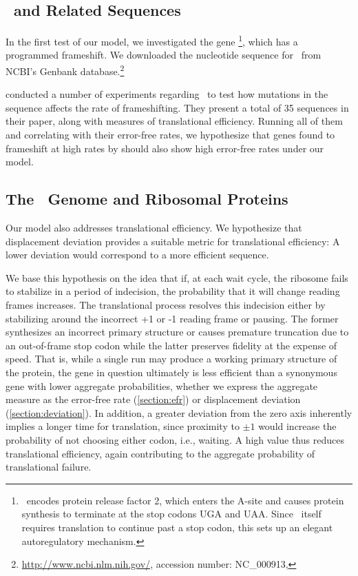 \documentclass[12pt]{article}
\begin{document}
\subsection{\prfB\ and Related Sequences}
In the first test of our model, we investigated the gene
\prfB\footnote{\prfB\ encodes protein release factor 2, which enters
  the A-site and causes protein synthesis to terminate at the stop
  codons \textsc{UGA} and \textsc{UAA}. Since \prfB\ itself requires 
  translation to continue past a stop codon, this sets up an elegant 
  autoregulatory mechanism.}, which has a programmed frameshift.
We downloaded the nucleotide sequence for \prfB\ from
NCBI's Genbank database.\footnote{\url{http://www.ncbi.nlm.nih.gov/},
  accession number: NC\_000913, \prfB}

\citet{weiss87} conducted a number of experiments regarding
\prfB\ to test how mutations in the sequence affects the rate of
frameshifting.  They present a total of 35 sequences in their paper,
along with measures of translational efficiency.  Running all of
them and correlating with their error-free rates, we hypothesize that
genes found to frameshift at high rates by
\citeauthor{weiss87} should also show high error-free rates under
our model.

\subsection{The \ecoli\ Genome and Ribosomal Proteins}
Our model also addresses
translational efficiency. We hypothesize that displacement deviation
provides a suitable metric for translational efficiency: A lower
deviation would correspond to a more efficient sequence.

We base this hypothesis on the idea that if, at each wait cycle, the
ribosome fails to stabilize in a period of indecision, the probability
that it will change reading frames increases. The translational
process resolves this indecision either by stabilizing around the
incorrect +1 or -1 reading frame or pausing. The former synthesizes an
incorrect primary structure or causes premature truncation due to an
out-of-frame stop codon while the latter preserves fidelity at the
expense of speed. That is, while a single run may produce
a working primary structure of the protein, the gene in question
ultimately is less efficient than a synonymous gene with lower
aggregate probabilities, whether we express the aggregate measure as the
error-free rate (\autoref{section:efr}) or displacement deviation
(\autoref{section:deviation}). In addition, a greater deviation from
the zero axis inherently implies a longer time for translation, 
since proximity to $\pm1$ would increase the probability of not choosing
either codon, i.e., waiting. A high value thus reduces translational
efficiency, again contributing to the aggregate probability of
translational failure.
\end{document}
